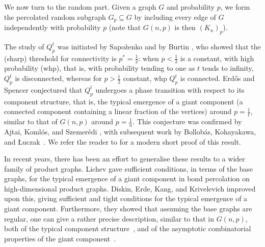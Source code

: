 \documentclass[10pt,a4paper]{article}
\begin{document}
We now turn to the random part.
Given a graph $G$ and probability $p$, we form the percolated random subgraph $G_p\subseteq G$ by including every edge of $G$ independently with probability $p$ (note that $G(n,p)$ is then $(K_n)_p$). 

The study of $Q^t_p$ was initiated by Sapo\v{z}enko \cite{S67} and by Burtin \cite{B77}, who showed that the (sharp) threshold for connectivity is $p^*=\frac{1}{2}$: when $p<\frac{1}{2}$ is a constant, with high probability (whp), that is, with probability tending to one as $t$ tends to infinity, $Q^t_p$ is disconnected, whereas for $p>\frac{1}{2}$ constant, whp $Q^t_p$ is connected. Erd\H{o}s and Spencer \cite{ES79} conjectured that $Q^t_p$ undergoes a phase transition with respect to its component structure, that is, the typical emergence of a giant component (a connected component containing a linear fraction of the vertices) around $p=\frac{1}{t}$, similar to that of $G(n,p)$ around $p=\frac{1}{n}$. This conjecture was confirmed by Ajtai, Koml\'os, and Szemer\'edi \cite{AKS81}, with subsequent work by Bollob\'as, Kohayakawa, and \L{}uczak~\cite{BKL92}. We refer the reader to \cite{K23} for a modern short proof of this result.

In recent years, there has been an effort to generalise these results to a wider family of product graphs. Lichev \cite{L22} gave sufficient conditions, in terms of the base graphs, for the typical emergence of a giant component in bond percolation on high-dimensional product graphs. Diskin, Erde, Kang, and Krivelevich \cite{DEKK23} improved upon this, giving sufficient and tight conditions for the typical emergence of a giant component. Furthermore, they showed that assuming the base graphs are regular, one can give a rather precise description, similar to that in $G(n,p)$, both of the typical component structure~\cite{DEKK22}, and of the asymptotic combinatorial properties of the giant component~\cite{DEKK24}. 
\end{document}
